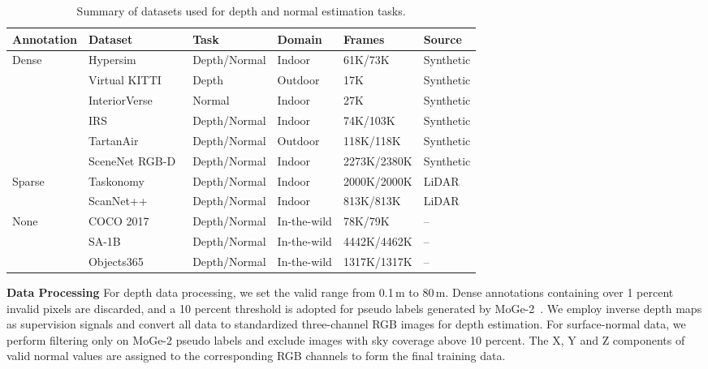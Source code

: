 \begin{table}[htbp]
  \centering
  \small
  \renewcommand{\arraystretch}{0.88}
  \setlength{\tabcolsep}{6pt}
    \begin{tabular}{l|l|l|l|l|l}
      \toprule
      Annotation & Dataset & Task & Domain & Frames & Source \\
      \midrule
      \multirow{6}{*}{Dense}
        & Hypersim~\cite{roberts2021hypersimphotorealisticsyntheticdataset}       & Depth/Normal & Indoor      & 61K/73K     & Synthetic \\
        & Virtual KITTI~\cite{gaidon2016virtualworldsproxymultiobject}  & Depth        & Outdoor     & 17K         & Synthetic \\
        &  InteriorVerse~\cite{zhu2022learningbasedinverserenderingcomplex}  & Normal       & Indoor      & 27K         & Synthetic \\
        & IRS~\cite{wang2021irslargenaturalisticindoor}            & Depth/Normal & Indoor      & 74K/103K    & Synthetic \\
        & TartanAir~\cite{wang2020tartanairdatasetpushlimits}      & Depth/Normal & Outdoor     & 118K/118K   & Synthetic \\
        & SceneNet RGB-D~\cite{mccormac2017scenenetrgbd5mphotorealistic} & Depth/Normal & Indoor      & 2273K/2380K & Synthetic \\
      \midrule
      \multirow{2}{*}{Sparse}
        & Taskonomy~\cite{zamir2018taskonomydisentanglingtasktransfer} & Depth/Normal & Indoor & 2000K/2000K & LiDAR \\
        & ScanNet++~\cite{yeshwanth2023scannethighfidelitydataset3d} & Depth/Normal & Indoor & 813K/813K   & LiDAR \\
      \midrule
      \multirow{3}{*}{None}
        & COCO 2017~\cite{lin2015microsoftcococommonobjects}  & Depth/Normal & In-the-wild & 78K/79K     & -- \\
        & SA-1B~\cite{sam}     & Depth/Normal & In-the-wild & 4442K/4462K & -- \\
        & Objects365~\cite{shao2019objects365} & Depth/Normal & In-the-wild & 1317K/1317K & -- \\
      \bottomrule
    \end{tabular}
  \caption{
    Summary of datasets used for depth and normal estimation tasks.
  }
  \label{tab:depth-normal-datasets}
\end{table}

\textbf{Data Processing}
For depth data processing, we set the valid range from 0.1\,m to 80\,m.
Dense annotations containing over 1 percent invalid pixels are discarded, and a 10 percent threshold is adopted for pseudo labels generated by MoGe-2~\cite{wang2025moge2}.
We employ inverse depth maps as supervision signals and convert all data to standardized three-channel RGB images for depth estimation.
For surface-normal data, we perform filtering only on MoGe-2 pseudo labels and exclude images with sky coverage above 10 percent.
The X, Y and Z components of valid normal values are assigned to the corresponding RGB channels to form the final training data.


